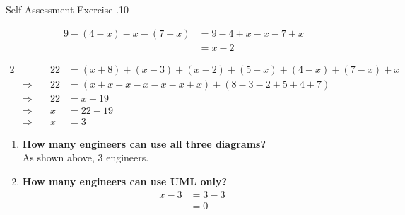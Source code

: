 \documentclass[../notes.tex]{subfiles}
\begin{document}
\begin{exercise}{Self Assessment Exercise \thechapter.10}
\begin{enumerate}
\begin{description}
\begin{align*}
									9 - (4 - x) - x - (7 - x) &= 9 - 4 + x - x - 7 + x\\
									&= x - 2
								\end{align*}
						\end{description}
						\begin{alignat*}{2}
							& & 22 &= (x + 8) + (x - 3) + (x - 2) + (5 - x) + (4 - x) + (7 - x) + x\\
							& \Rightarrow \quad & 22 &= (x + x + x - x - x - x + x) + (8 - 3 - 2 + 5 + 4 + 7)\\
							& \Rightarrow \quad & 22 &= x + 19\\
							& \Rightarrow \quad & x &= 22 - 19\\
							& \Rightarrow \quad & x &= 3
						\end{alignat*}
						\begin{enumerate}
							\item \textbf{How many engineers can use all three diagrams?}\\
								As shown above, $3$ engineers.
							\item \textbf{How many engineers can use UML only?}
								\begin{align*}
									x - 3 &= 3 - 3\\
									&= 0
								\end{align*}
						\end{enumerate}
					\end{enumerate}
				\end{exercise}
\end{document}
